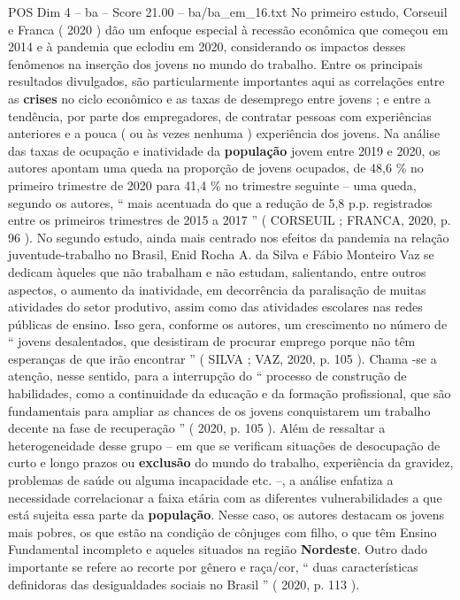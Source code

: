 \begin{textsample}{POS Dim 4 – ba – Score 21.00 – ba/ba\_em\_16.txt}
No primeiro estudo, Corseuil e Franca ( 2020 ) dão um enfoque especial à recessão econômica que começou em 2014 e à pandemia que eclodiu em 2020, considerando os impactos desses fenômenos na inserção dos jovens no mundo do trabalho.
Entre os principais resultados divulgados, são particularmente importantes aqui as correlações entre as \textbf{crises} no ciclo econômico e as taxas de desemprego entre jovens ; e entre a tendência, por parte dos empregadores, de contratar pessoas com experiências anteriores e a pouca ( ou às vezes nenhuma ) experiência dos jovens.
Na análise das taxas de ocupação e inatividade da \textbf{população} jovem entre 2019 e 2020, os autores apontam uma queda na proporção de jovens ocupados, de 48,6 \% no primeiro trimestre de 2020 para 41,4 \% no trimestre seguinte – uma queda, segundo os autores, “ mais acentuada do que a redução de 5,8 p.p. registrados entre os primeiros trimestres de 2015 a 2017 ” ( CORSEUIL ; FRANCA, 2020, p. 96 ).
No segundo estudo, ainda mais centrado nos efeitos da pandemia na relação juventude-trabalho no Brasil, Enid Rocha A. da Silva e Fábio Monteiro Vaz se dedicam àqueles que não trabalham e não estudam, salientando, entre outros aspectos, o aumento da inatividade, em decorrência da paralisação de muitas atividades do setor produtivo, assim como das atividades escolares nas redes públicas de ensino.
Isso gera, conforme os autores, um crescimento no número de “ jovens desalentados, que desistiram de procurar emprego porque não têm esperanças de que irão encontrar ” ( SILVA ; VAZ, 2020, p. 105 ).
Chama -se a atenção, nesse sentido, para a interrupção do “ processo de construção de habilidades, como a continuidade da educação e da formação profissional, que são fundamentais para ampliar as chances de os jovens conquistarem um trabalho decente na fase de recuperação ” ( 2020, p. 105 ).
Além de ressaltar a heterogeneidade desse grupo – em que se verificam situações de desocupação de curto e longo prazos ou \textbf{exclusão} do mundo do trabalho, experiência da gravidez, problemas de saúde ou alguma incapacidade etc. –, a análise enfatiza a necessidade correlacionar a faixa etária com as diferentes vulnerabilidades a que está sujeita essa parte da \textbf{população}.
Nesse caso, os autores destacam os jovens mais pobres, os que estão na condição de cônjuges com filho, o que têm Ensino Fundamental incompleto e aqueles situados na região \textbf{Nordeste}.
Outro dado importante se refere ao recorte por gênero e raça/cor, “ duas características definidoras das desigualdades sociais no Brasil ” ( 2020, p. 113 ).

\end{textsample}

